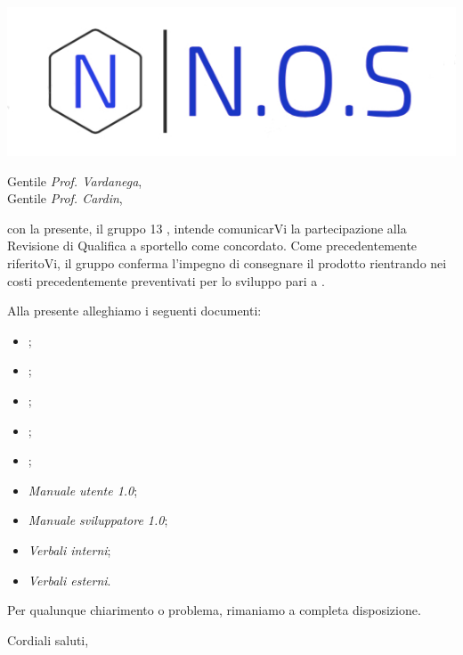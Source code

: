 \documentclass[12pt]{letter}
\date{10 aprile 2021}
\begin{document}
\begin{letter}{ }

\includegraphics[scale=1.5
]{../../../Immagini/N.O.S.jpg}

\opening{Gentile \textit{Prof. Vardanega},\\ Gentile \textit{Prof. Cardin}, }

con la presente, il gruppo 13 {\Gruppo}, intende comunicarVi la partecipazione alla Revisione di Qualifica a sportello come concordato.
Come precedentemente riferitoVi, il gruppo conferma l'impegno di consegnare il prodotto rientrando nei costi precedentemente preventivati per lo sviluppo pari a .

Alla presente alleghiamo i seguenti documenti:

\begin{itemize}
	\item {};
	\item {};
	\item {};
	\item {};
	\item {};
	\item \textit{Manuale utente 1.0};
	\item \textit{Manuale sviluppatore 1.0};
	\item \textit{Verbali interni};
	\item \textit{Verbali esterni}.
\end{itemize}

Per qualunque chiarimento o problema, rimaniamo a completa disposizione.

\closing{Cordiali saluti,}

\vspace{2em}

\end{letter}
\end{document}
